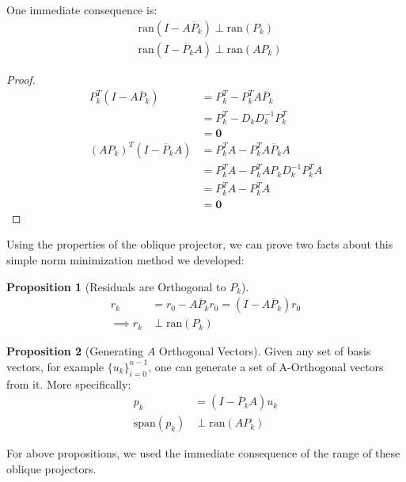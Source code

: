 \documentclass[]{article}
\theoremstyle{definition}
\newtheorem{prop}{Proposition}[section]  %
\begin{document}
            One immediate consequence is: 
            \begin{align}
                & \text{ran}(I - A\overline{P}_k )\perp \text{ran}(P_k)
                \\
                & \text{ran}(I - \overline{P}_kA) \perp \text{ran}(AP_k)
            \end{align}
            \begin{proof}
                \begin{align}
                    P_k^T(I - A\overline{P}_k) &= P_k^T - P_k^{T}A\overline{P}_k
                    \\
                    &= P_k^{T} - D_kD_k^{-1}P^T_k
                    \\
                    &= \mathbf{0}
                    \\
                    (AP_k)^T(I - \overline{P}_kA) &=P_k^TA - P_k^TA\overline{P}_kA
                    \\
                    &= P_k^TA - P_k^TAP_kD_k^{-1}P_k^TA
                    \\
                    &= P_k^TA - P^T_kA 
                    \\
                    &= \mathbf{0}
                \end{align}
            \end{proof}
            Using the properties of the oblique projector, we can prove two facts about this simple norm minimization method we developed: 
            \begin{prop}[Residuals are Orthogonal to $P_k$]\label{prop:Residuals_are_Orthogonal_to_P_k}
                \begin{align}
                    r_k &= r_0 - A\overline{P}_kr_0 = (I - A\overline{P}_k)r_0
                    \\
                    \implies 
                    r_k &\perp \text{ran}(P_k)
                \end{align}
            \end{prop}
            \begin{prop}[Generating $A$ Orthogonal Vectors]
                Given any set of basis vectors, for example $\{u_k\}_{i = 0}^{n - 1}$, one can generate a set of A-Orthogonal vectors from it. More specifically: 
                \begin{align}
                    p_k &= (I - \overline{P}_kA)u_k
                    \\
                    \text{span}(p_k) &\perp \text{ran}(AP_k)
                \end{align}
            \end{prop}
            For above propositions, we used the immediate consequence of the range of these oblique projectors. 
\end{document}
